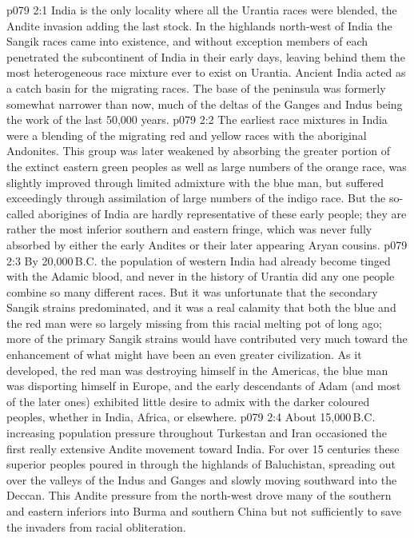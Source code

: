 \vs p079 2:1 India is the only locality where all the Urantia races were blended, the Andite invasion adding the last stock. In the highlands north\hyp{}west of India the Sangik races came into existence, and without exception members of each penetrated the subcontinent of India in their early days, leaving behind them the most heterogeneous race mixture ever to exist on Urantia. Ancient India acted as a catch basin for the migrating races. The base of the peninsula was formerly somewhat narrower than now, much of the deltas of the Ganges and Indus being the work of the last 50,000 years.
\vs p079 2:2 The earliest race mixtures in India were a blending of the migrating red and yellow races with the aboriginal Andonites. This group was later weakened by absorbing the greater portion of the extinct eastern green peoples as well as large numbers of the orange race, was slightly improved through limited admixture with the blue man, but suffered exceedingly through assimilation of large numbers of the indigo race. But the so\hyp{}called aborigines of India are hardly representative of these early people; they are rather the most inferior southern and eastern fringe, which was never fully absorbed by either the early Andites or their later appearing Aryan cousins.
\vs p079 2:3 \pc By 20,000\,B.C. the population of western India had already become tinged with the Adamic blood, and never in the history of Urantia did any one people combine so many different races. But it was unfortunate that the secondary Sangik strains predominated, and it was a real calamity that both the blue and the red man were so largely missing from this racial melting pot of long ago; more of the primary Sangik strains would have contributed very much toward the enhancement of what might have been an even greater civilization. As it developed, the red man was destroying himself in the Americas, the blue man was disporting himself in Europe, and the early descendants of Adam (and most of the later ones) exhibited little desire to admix with the darker coloured peoples, whether in India, Africa, or elsewhere.
\vs p079 2:4 \pc About 15,000\,B.C. increasing population pressure throughout Turkestan and Iran occasioned the first really extensive Andite movement toward India. For over 15 centuries these superior peoples poured in through the highlands of Baluchistan, spreading out over the valleys of the Indus and Ganges and slowly moving southward into the Deccan. This Andite pressure from the north\hyp{}west drove many of the southern and eastern inferiors into Burma and southern China but not sufficiently to save the invaders from racial obliteration.
